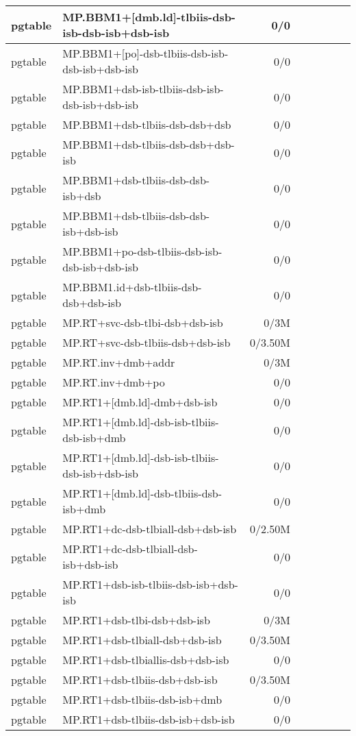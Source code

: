 \begin{tabular}{l l  | r r l | r r l}
   pgtable&MP.BBM1+[dmb.ld]-tlbiis-dsb-isb-dsb-isb+dsb-isb&0/0&&&\\
\hline
   pgtable&MP.BBM1+[po]-dsb-tlbiis-dsb-isb-dsb-isb+dsb-isb&0/0&&&\\
\hline
   pgtable&MP.BBM1+dsb-isb-tlbiis-dsb-isb-dsb-isb+dsb-isb&0/0&&&\\
\hline
   pgtable&MP.BBM1+dsb-tlbiis-dsb-dsb+dsb&0/0&&&\\
\hline
   pgtable&MP.BBM1+dsb-tlbiis-dsb-dsb+dsb-isb&0/0&&&\\
\hline
   pgtable&MP.BBM1+dsb-tlbiis-dsb-dsb-isb+dsb&0/0&&&\\
\hline
   pgtable&MP.BBM1+dsb-tlbiis-dsb-dsb-isb+dsb-isb&0/0&&&\\
\hline
   pgtable&MP.BBM1+po-dsb-tlbiis-dsb-isb-dsb-isb+dsb-isb&0/0&&&\\
\hline
   pgtable&MP.BBM1.id+dsb-tlbiis-dsb-dsb+dsb-isb&0/0&&&\\
\hline
   pgtable&MP.RT+svc-dsb-tlbi-dsb+dsb-isb&0/3M&&&\\
\hline
   pgtable&MP.RT+svc-dsb-tlbiis-dsb+dsb-isb&0/3.50M&&&\\
\hline
   pgtable&MP.RT.inv+dmb+addr&0/3M&&&\\
\hline
   pgtable&MP.RT.inv+dmb+po&0/0&&&\\
\hline
   pgtable&MP.RT1+[dmb.ld]-dmb+dsb-isb&0/0&&&\\
\hline
   pgtable&MP.RT1+[dmb.ld]-dsb-isb-tlbiis-dsb-isb+dmb&0/0&&&\\
\hline
   pgtable&MP.RT1+[dmb.ld]-dsb-isb-tlbiis-dsb-isb+dsb-isb&0/0&&&\\
\hline
   pgtable&MP.RT1+[dmb.ld]-dsb-tlbiis-dsb-isb+dmb&0/0&&&\\
\hline
   pgtable&MP.RT1+dc-dsb-tlbiall-dsb+dsb-isb&0/2.50M&&&\\
\hline
   pgtable&MP.RT1+dc-dsb-tlbiall-dsb-isb+dsb-isb&0/0&&&\\
\hline
   pgtable&MP.RT1+dsb-isb-tlbiis-dsb-isb+dsb-isb&0/0&&&\\
\hline
   pgtable&MP.RT1+dsb-tlbi-dsb+dsb-isb&0/3M&&&\\
\hline
   pgtable&MP.RT1+dsb-tlbiall-dsb+dsb-isb&0/3.50M&&&\\
\hline
   pgtable&MP.RT1+dsb-tlbiallis-dsb+dsb-isb&0/0&&&\\
\hline
   pgtable&MP.RT1+dsb-tlbiis-dsb+dsb-isb&0/3.50M&&&\\
\hline
   pgtable&MP.RT1+dsb-tlbiis-dsb-isb+dmb&0/0&&&\\
\hline
   pgtable&MP.RT1+dsb-tlbiis-dsb-isb+dsb-isb&0/0&&&\\

\end{tabular}
